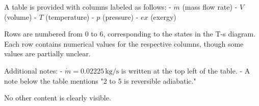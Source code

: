A table is provided with columns labeled as follows:  
- \( \dot{m} \) (mass flow rate)  
- \( V \) (volume)  
- \( T \) (temperature)  
- \( p \) (pressure)  
- \( ex \) (exergy)  

Rows are numbered from 0 to 6, corresponding to the states in the T-s diagram. Each row contains numerical values for the respective columns, though some values are partially unclear.  

Additional notes:  
- \( \dot{m} = 0.02225 \, \text{kg/s} \) is written at the top left of the table.  
- A note below the table mentions "2 to 5 is reversible adiabatic."  

No other content is clearly visible.